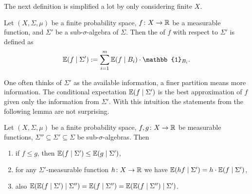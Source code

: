 The next definition is simplified a lot by only considering finite $X$.

\begin{definition}
Let $(X,\Sigma,\mu)$ be a finite probability space, $f\colon X\to \mathbb{R}$ be a measurable function, and $\Sigma'$ be a sub-$\sigma$-algebra of $\Sigma$. Then the  of $f$ with respect to $\Sigma'$ is defined as
\[\E(f\mid \Sigma'):=\sum_{i=1}^{m}\E(f\mid B_i)\cdot \mathbb{1}_{B_i}.\]
\end{definition}


One often thinks of $\Sigma'$ as the available information, a finer partition means more information. The conditional expectation $\mathbb{E}(f\mid \Sigma')$ is the best approximation of $f$ given only the information from $\Sigma'$. 
With this intuition the statements from the following lemma are not surprising. 
\begin{lemma}\label{lem:condExp}
Let $(X,\Sigma,\mu)$ be a finite probability space, $f,g\colon X\to \mathbb{R}$ be measurable functions, $\Sigma''\subseteq\Sigma'\subseteq\Sigma$ be sub-$\sigma$-algebras. Then
\begin{enumerate}[label=\roman*)]
\item if $f\leq g$, then $\mathbb{E}(f\mid \Sigma')\leq\mathbb{E}(g\mid \Sigma')$,
\item for any $\Sigma'$-measurable function $h\colon X\to\mathbb{R}$ we have $\mathbb{E}(h f\mid\Sigma')=h\cdot\mathbb{E}(f\mid\Sigma')$,
\item also $\mathbb{E}(\mathbb{E}(f\mid \Sigma')\mid\Sigma'')=\mathbb{E}(f\mid\Sigma'')=\mathbb{E}(\mathbb{E}(f\mid \Sigma'')\mid\Sigma')$.
\end{enumerate}
\end{lemma}
